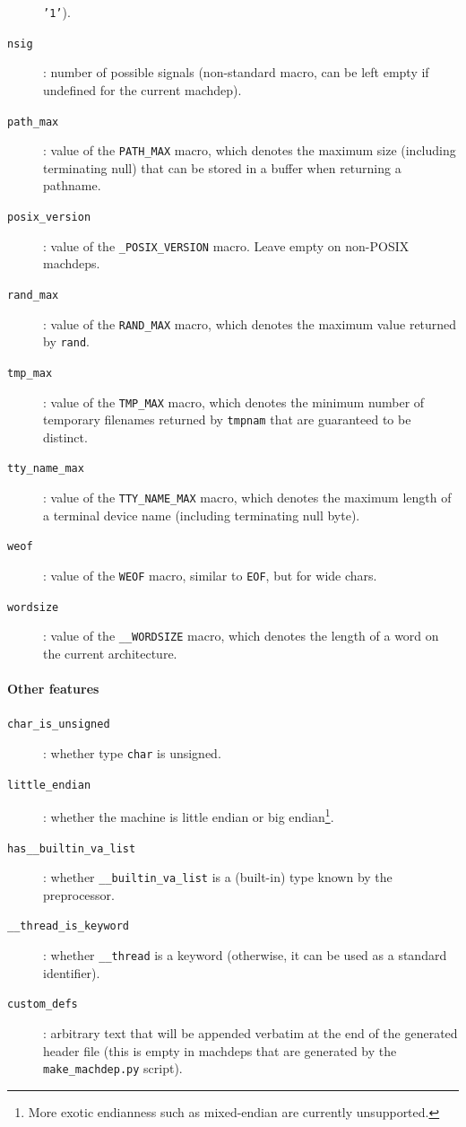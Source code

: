 \begin{description}
    \texttt{'1'}).
  \item[\texttt{nsig}]: number of possible signals (non-standard macro, can be left
    empty if undefined for the current machdep).
  \item[\texttt{path\_max}]: value of the \texttt{PATH\_MAX} macro, which denotes
    the maximum size (including terminating null) that can be stored in a buffer
    when returning a pathname.
  \item[\texttt{posix\_version}]: value of the \texttt{\_POSIX\_VERSION} macro.
    Leave empty on non-POSIX machdeps.
  \item[\texttt{rand\_max}]: value of the \texttt{RAND\_MAX} macro, which denotes
    the maximum value returned by \texttt{rand}.
  \item[\texttt{tmp\_max}]: value of the \texttt{TMP\_MAX} macro, which denotes
    the minimum number of temporary filenames returned by \texttt{tmpnam} that
    are guaranteed to be distinct.
  \item[\texttt{tty\_name\_max}]: value of the \texttt{TTY\_NAME\_MAX} macro, which
    denotes the maximum length of a terminal device name (including terminating null byte).
  \item[\texttt{weof}]: value of the \texttt{WEOF} macro, similar to \texttt{EOF},
    but for wide chars.
  \item[\texttt{wordsize}]: value of the \texttt{\_\_WORDSIZE} macro, which denotes
    the length of a word on the current architecture.
\end{description}

\paragraph{Other features}
\begin{description}
  \item[\texttt{char\_is\_unsigned}]: whether type \verb+char+ is unsigned.
  \item[\texttt{little\_endian}]: whether the machine is little endian or big
    endian\footnote{More exotic endianness such as mixed-endian are currently unsupported.}.
  \item[\texttt{has\_\_builtin\_va\_list}]: whether \verb+__builtin_va_list+
    is a (built-in) type known by the preprocessor.
  \item[\texttt{\_\_thread\_is\_keyword}]: whether \verb+__thread+ is a
    keyword (otherwise, it can be used as a standard identifier).
  \item[\texttt{custom\_defs}]: arbitrary text that will be appended
    verbatim at the
    end of the generated header file (this is empty in machdeps that are
    generated by the \texttt{make\_machdep.py} script).
\end{description}

